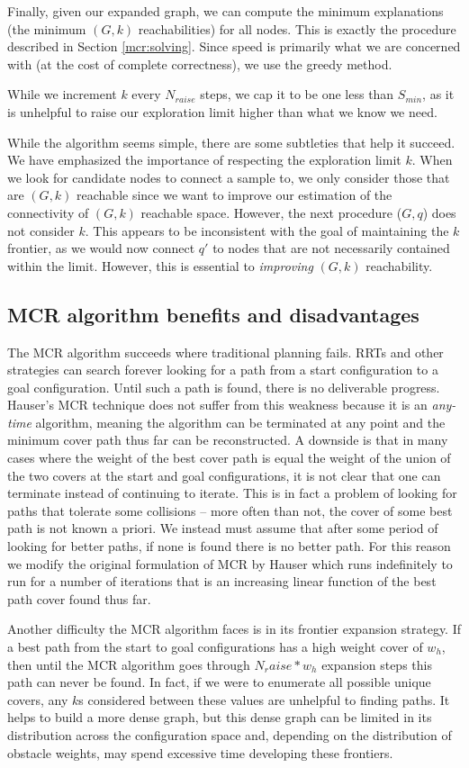 Finally, given our expanded graph, we can compute the minimum explanations (the minimum $(G,k)$ reachabilities) for all nodes. This is exactly the procedure described in Section \ref{mcr:solving}. Since speed is primarily what we are concerned with (at the cost of complete correctness), we use the greedy method.

While we increment $k$ every $N_{raise}$ steps, we cap it to be one less than $S_{min}$, as it is unhelpful to raise our exploration limit higher than what we know we need. 

While the algorithm seems simple, there are some subtleties that help it succeed. We have emphasized the importance of respecting the exploration limit $k$. When we look for candidate nodes to connect a sample to, we only consider those that are $(G,k)$ reachable since we want to improve our estimation of the connectivity of $(G,k)$ reachable space. However, the next procedure ($G,q$) does not consider $k$. This appears to be inconsistent with the goal of maintaining the $k$ frontier, as we would now connect $q'$ to nodes that are not necessarily contained within the limit. However, this is essential to \emph{improving} $(G,k)$ reachability.

\subsection{MCR algorithm benefits and disadvantages}
The MCR algorithm succeeds where traditional planning fails. RRTs and other strategies can search forever looking for a path from a start configuration to a goal configuration. Until such a path is found, there is no deliverable progress. Hauser's MCR technique does not suffer from this weakness because it is an \emph{any-time} algorithm, meaning the algorithm can be terminated at any point and the minimum cover path thus far can be reconstructed. A downside is that in many cases where the weight of the best cover path is equal the weight of the union of the two covers at the start and goal configurations, it is not clear that one can terminate instead of continuing to iterate. This is in fact a problem of looking for paths that tolerate some collisions -- more often than not, the cover of some best path is not known a priori. We instead must assume that after some period of looking for better paths, if none is found there is no better path. For this reason we modify the original formulation of MCR by Hauser which runs indefinitely to run for a number of iterations that is an increasing linear function of the best path cover found thus far.

Another difficulty the MCR algorithm faces is in its frontier expansion strategy. If a best path from the start to goal configurations has a high weight cover of $w_h$, then until the MCR algorithm goes through $N_raise * w_h$ expansion steps this path can never be found. In fact, if we were to enumerate all possible unique covers, any $k$s considered between these values are unhelpful to finding paths. It helps to build a more dense graph, but this dense graph can be limited in its distribution across the configuration space and, depending on the distribution of obstacle weights, may spend excessive time developing these frontiers.

